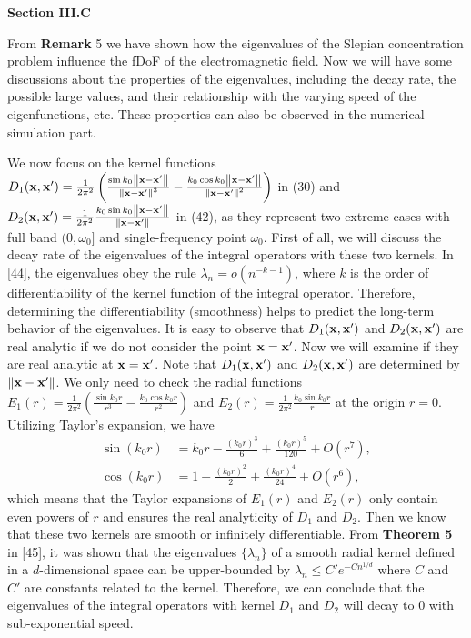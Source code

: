 \documentclass[a4paper,12pt]{article}
\begin{document}
\begin{framed}
	{\bf Section III.C}

\setcounter{equation}{46}

{\color{red}
	
	\quad From {\bf Remark} 5 we have shown how the eigenvalues of the Slepian concentration problem influence the fDoF of the electromagnetic field. Now we will have some discussions about the properties of the eigenvalues, including the decay rate, the possible large values, and their relationship with the varying speed of the eigenfunctions, etc. These properties can also be observed in the numerical simulation part. 
	
	\quad We now focus on the kernel functions $D_1({\bf x},{\bf x}')=\frac{1}{2\pi^2} \left( \frac{\sin k_0\left\| {\bf x}-{\bf x}' \right\|}{\left\| {\bf x}-{\bf x}' \right\|^3}-\frac{k_0\cos k_0\left\| {\bf x}-{\bf x}' \right\|}{\left\| {\bf x}-{\bf x}' \right\|^2} \right)$ in (30) and $D_2({\bf x},{\bf x}') = \frac{1}{2\pi^2} \frac{k_0\sin k_0 \left\| {\bf x}-{\bf x}' \right\|}{\left\|  {\bf x}-{\bf x}' \right\|}$ in (42), as they represent two extreme cases with full band $(0,\omega_0]$ and single-frequency point $\omega_0$. First of all, we will discuss the decay rate of the eigenvalues of the integral operators with these two kernels. In [44], the eigenvalues obey the rule $\lambda_n  = o(n^{-k-1})$, where $k$ is the order of differentiability of the kernel function of the integral operator. Therefore, determining the differentiability (smoothness) helps to predict the long-term behavior of the eigenvalues.
	It is easy to observe that $D_1({\bf x},{\bf x}')$ and $D_2({\bf x},{\bf x}')$ are real analytic if we do not consider the point ${\bf x} = {\bf x}'$. Now we will examine if they are real analytic at ${\bf x} = {\bf x}'$. 
	Note that $D_1({\bf x},{\bf x}')$ and $D_2({\bf x},{\bf x}')$ are determined by $\left\|{\bf x}-{\bf x}'\right\|$. We only need to check the radial functions $E_1(r) = \frac{1}{2\pi^2} \left( \frac{\sin k_0 r}{r^3} - \frac{k_0 \cos k_0 r}{r^2} \right)$ and $E_2(r) = \frac{1}{2 \pi^2} \frac{k_0 \sin k_0 r}{r}$ at the origin $r = 0$. Utilizing Taylor's expansion, we have 
	\begin{equation}\begin{aligned}\sin(k_0r)&=k_0r-\frac{(k_0r)^3}{6}+\frac{(k_0r)^5}{120}+O(r^7),\\\cos(k_0r)&=1-\frac{(k_0r)^2}{2}+\frac{(k_0r)^4}{24}+O(r^6),\end{aligned}\end{equation}
	which means that the Taylor expansions of $E_1(r)$ and $E_2(r)$ only contain even powers of $r$ and ensures the real analyticity of $D_1$ and $D_2$. Then we know that these two kernels are smooth or infinitely differentiable. From {\bf Theorem 5} in [45], it was shown that the eigenvalues $\{\lambda_n\}$ of a smooth radial kernel defined in a $d$-dimensional space can be upper-bounded by $\lambda_n \leqslant C' e^{-C n^{1/d}}$ where $C$ and $C'$ are constants related to the kernel. Therefore, we can conclude that the eigenvalues of the integral operators with kernel $D_1$ and $D_2$ will decay to 0 with sub-exponential speed.   
	
}
\end{framed}
\end{document}
